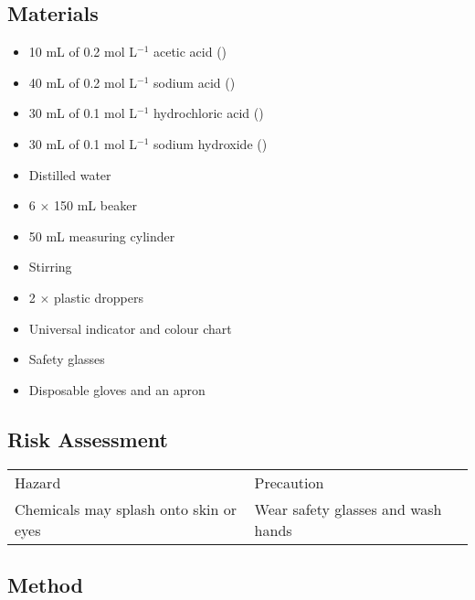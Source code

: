 	\subsection{Materials}
	
		\begin{itemize}
			\item 10 mL of 0.2 mol L$^{-1}$ acetic acid ()
			\item 40 mL of 0.2 mol L$^{-1}$ sodium acid ()
			\item 30 mL of 0.1 mol L$^{-1}$ hydrochloric acid ()
			\item 30 mL of 0.1 mol L$^{-1}$ sodium hydroxide ()
			\item Distilled water
			\item 6 $\times$ 150 mL beaker
			\item 50 mL measuring cylinder
			\item Stirring
			\item 2 $\times$ plastic droppers
			\item Universal indicator and colour chart
			\item Safety glasses
			\item Disposable gloves and an apron
		\end{itemize}

	\subsection{Risk Assessment}
	
		\begin{table}[H]
			\centering
			\begin{tabular}{p{7cm}|p{7cm}}
				Hazard & Precaution \\
				Chemicals may splash onto skin or eyes & Wear safety glasses and wash hands
			\end{tabular}
		\end{table}

	\subsection{Method}
	
